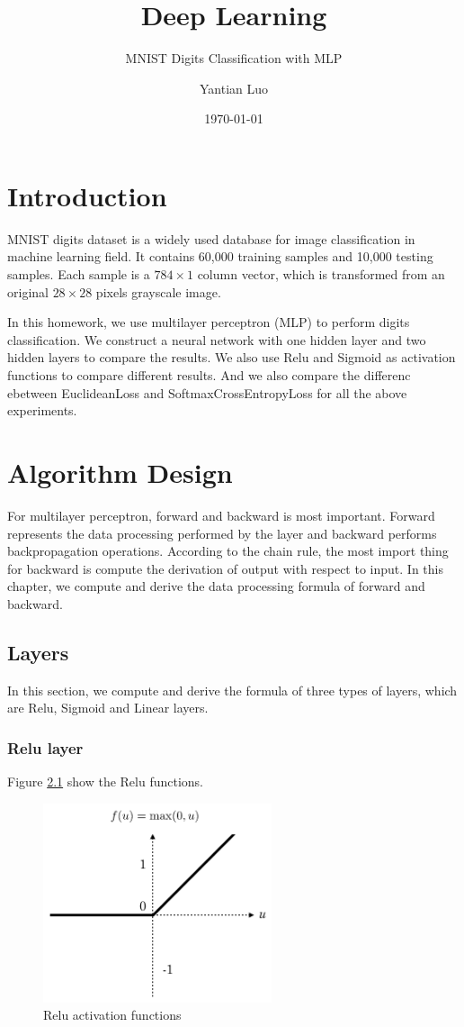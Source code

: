 \documentclass{elegantbook}
\title{Deep Learning}
\subtitle{MNIST Digits Classification with MLP}
\author{Yantian Luo}
\institute{Electronic Engineering}
\date{\today}
\begin{document}
\maketitle
\tableofcontents
\mainmatter
\hypersetup{pageanchor=true}
\chapter{Introduction}
MNIST digits dataset is a widely used database for image classification in machine learning field. It contains 60,000 training samples and 10,000 testing samples. Each sample is a $784\times1$ column vector, which is transformed from an original $28\times28$ pixels grayscale image.

In this homework, we use multilayer perceptron (MLP) to perform digits classification. We construct a neural network with one hidden layer and two hidden layers to compare the results. We also use Relu and Sigmoid as activation functions to compare different results. And we also compare the differenc ebetween EuclideanLoss and SoftmaxCrossEntropyLoss for all the above experiments.

\chapter{Algorithm Design}
For multilayer perceptron, forward and backward is most important. Forward represents the data processing performed by the layer and backward performs backpropagation operations. According to the chain rule, the most import thing for backward is compute the derivation of output with respect to input. In this chapter, we compute and derive the data processing formula of forward and backward.

\section{Layers}
In this section, we compute and derive the formula of three types of layers, which are Relu, Sigmoid and Linear layers.

\subsection{Relu layer}
Figure \ref{relu} show the Relu functions. 
\begin{figure}[!ht]
	\centering
	\includegraphics[width=0.6\textwidth]{relu1.png}
	\caption{\label{relu}Relu activation functions}
\end{figure}
\end{document}
